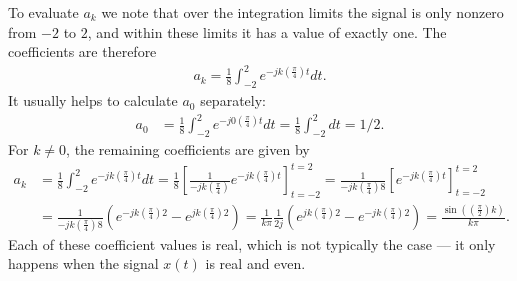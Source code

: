\documentclass[10pt]{beamer}
\begin{document}
To evaluate $a_k$ we note that over the integration limits the signal is only nonzero from $-2$ to $2$, and within these limits it has a value of exactly one.  The coefficients are therefore
\begin{align*}
  a_k = \frac{1}{8} \int_{-2}^{2} e^{-j k \left( \frac{\pi}{4} \right) t} dt.
\end{align*}
It usually helps to calculate $a_0$ separately:
\begin{align*}
  a_0 &= \frac{1}{8} \int_{-2}^{2} e^{-j 0 \left( \frac{\pi}{4} \right) t} dt = \frac{1}{8} \int_{-2}^{2} dt = 1/2.
\end{align*}
For $k \neq 0$, the remaining coefficients are given by
\begin{align*}
  a_k &= \frac{1}{8} \int_{-2}^{2} e^{-j k \left( \frac{\pi}{4} \right) t} dt 
  = \frac{1}{8} \left[ \frac{1}{-j k \left( \frac{\pi}{4} \right)} e^{-j k \left( \frac{\pi}{4} \right) t} \right]_{t=-2}^{t=2} 
  = \frac{1}{-j k \left( \frac{\pi}{4} \right) 8} \left[ e^{-j k \left( \frac{\pi}{4} \right) t} \right]_{t=-2}^{t=2} \\
  &= \frac{1}{-j k \left( \frac{\pi}{4} \right) 8} \left( e^{-j k \left( \frac{\pi}{4} \right) 2} - e^{j k \left( \frac{\pi}{4} \right) 2} \right) 
  = \frac{1}{k \pi} \frac{1}{2j} \left( e^{j k \left( \frac{\pi}{4} \right) 2} - e^{-j k \left( \frac{\pi}{4} \right) 2} \right)
  = \frac{\sin(\left( \frac{\pi}{2} \right) k)}{k \pi}.
\end{align*}
Each of these coefficient values is real, which is not typically the case --- it only happens when the signal $x(t)$ is real and even.
\end{document}
